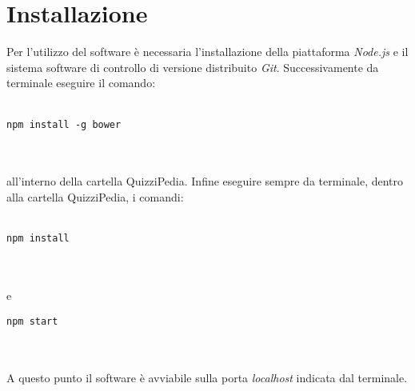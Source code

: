 \newpage
\section{Installazione}
Per l'utilizzo del software è necessaria l'installazione della piattaforma \textit{Node.js} e il sistema software di controllo di versione distribuito \textit{Git}. Successivamente da terminale eseguire il comando:\\
\\
\centerline{\texttt{npm install -g bower}}\\
\\
all'interno della cartella QuizziPedia. Infine eseguire sempre da terminale, dentro alla cartella QuizziPedia, i comandi:\\
\\
\centerline{\texttt{npm install}}\\
\\
e
\\
\centerline{\texttt{npm start}}\\
\\
A questo punto il software è avviabile sulla porta \textit{localhost} indicata dal terminale.

